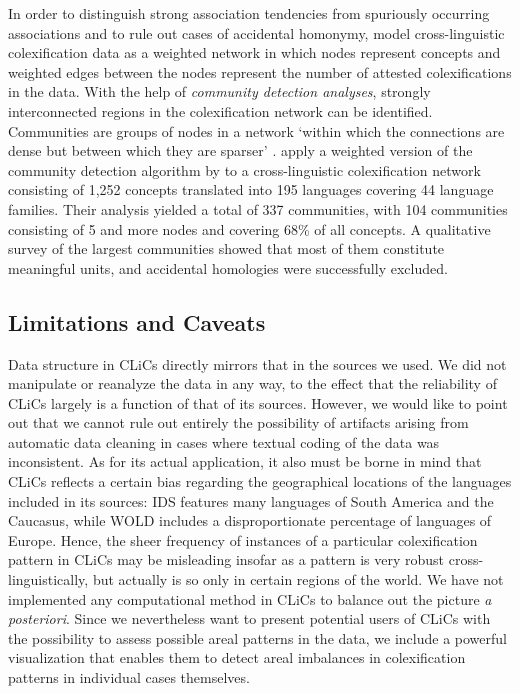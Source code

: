 In order to distinguish strong association tendencies from spuriously occurring associations and to
rule out cases of accidental homonymy,  model cross-linguistic colexification
data as a weighted network in which nodes represent concepts and weighted edges between the nodes
represent the number of attested colexifications in the data.  With the help of \emph{community
detection analyses}, strongly interconnected regions in the colexification network can be
identified. 
Communities are groups of nodes in a network
`within which the connections are dense but between which they are sparser' \cite{Newman2004}.
 apply a weighted version of the community detection algorithm by
 to a cross-linguistic colexification network consisting of 1,252 concepts
translated into 195 languages covering 44 language families. Their analysis yielded a total of 337
communities, with 104 communities consisting of 5 and more nodes and covering 68\% of all concepts.
A qualitative survey of the largest communities showed that most of them constitute meaningful
units, and accidental homologies were successfully excluded.

\subsection{Limitations and Caveats} \label{caveats}

Data structure in CLiCs directly mirrors that in the sources we used. We did not manipulate or
reanalyze the data in any way, to the effect that the reliability of CLiCs largely is a function of
that of its sources. However, we would like to point out that we cannot rule out entirely the
possibility of artifacts arising from automatic data cleaning in cases where textual coding of the
data was inconsistent. As for its actual application, it also must be borne in mind that CLiCs
reflects a certain bias regarding the geographical locations of the languages included in its
sources: IDS features many languages of South America and the Caucasus, while WOLD includes a
disproportionate percentage of languages of Europe. Hence, the sheer frequency of instances of a
particular colexification pattern in CLiCs may be misleading insofar as a pattern is very robust
cross-linguistically, but actually is so only in certain regions of the world. We have not
implemented any computational method in CLiCs to balance out the picture \emph{a posteriori}. Since
we nevertheless want to present potential users of CLiCs with the possibility to assess possible
areal patterns in the data, we include a powerful visualization that enables them to detect areal
imbalances in colexification patterns in individual cases themselves.


